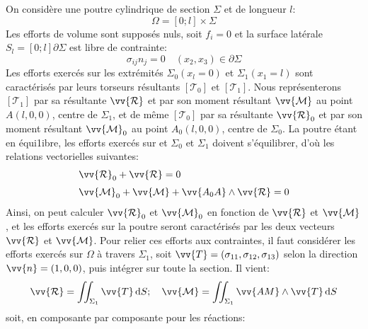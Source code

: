 On considère une poutre cylindrique de section $\Sigma$ et de longueur $l$:
\begin{equation*}     
\Omega = \left[ 0;l \right] \times \Sigma
\end{equation*}
Les efforts de volume sont supposés nuls, soit $f_i= 0$ et la surface latérale  $S_l= \left[ 0;l \right]\partial \Sigma$ est libre de contrainte:
\begin{equation}
    \sigma_{ij} n_j = 0 \quad \left( x_2, x_3 \right) \in \partial \Sigma
    \label{eq:Ch07-001}
\end{equation}
Les efforts exercés sur les extrémités $\Sigma_0 \left( x_l =0 \right)$ et $\Sigma_1 \left( x_1 =l \right)$ sont caractérisés par leurs torseurs résultants $\left[ \mathcal{T}_0 \right]$ et $\left[ \mathcal{T}_1 \right]$.
Nous représenterons $\left[ \mathcal{T}_1 \right]$ par sa résultante $\vv{\mathcal{R}}$ et par son moment résultant $\vv{\mathcal{M}}$ au point $A\left( l,0,0 \right)$, centre de $\Sigma_1$, et de même $\left[ \mathcal{T}_0 \right]$ par sa résultante $\vv{\mathcal{R}}_0$ et par son moment résultant $\vv{\mathcal{M}}_0$ au point $A_0\left( l,0,0 \right)$, centre de $\Sigma_0$.
La poutre étant en équi1ibre, les efforts exercés sur et $\Sigma_0$ et $\Sigma_1$ doivent s'équilibrer, d'où les relations vectorielles suivantes:
\begin{equation}
    \begin{aligned}
        & \vv{\mathcal{R}}_0 + \vv{\mathcal{R}} = 0 \\[3pt]
        & \vv{\mathcal{M}}_0 + \vv{\mathcal{M}} + \vv{A_0 A} \wedge  \vv{\mathcal{R}} = 0
    \end{aligned}
    \label{eq:Ch07-002}
\end{equation}
Ainsi, on peut calculer $\vv{\mathcal{R}}_0$ et $\vv{\mathcal{M}}_0$ en fonction de $\vv{\mathcal{R}}$ et $\vv{\mathcal{M}}$, et les efforts exercés sur la poutre seront caractérisés par les deux vecteurs $\vv{\mathcal{R}}$ et $\vv{\mathcal{M}}$. Pour relier ces efforts aux contraintes, il faut considérer les efforts exercés sur $\Omega$ à travers  $\Sigma_1$, soit $\vv{T} = \left( \sigma_{11}, \sigma_{12}, \sigma_{13} \right)$ selon la direction $\vv{n} = \left( 1,0,0 \right)$, puis intégrer sur toute la section. Il vient:
\begin{equation}
    \vv{\mathcal{R}} = \iint_{\Sigma_1} \vv{T} \ud S;\quad \vv{\mathcal{M}} = \iint_{\Sigma_1} \vv{AM} \wedge \vv{T} \ud S
    \label{eq:Ch07-004}
\end{equation}
soit, en composante par composante pour les réactions:

